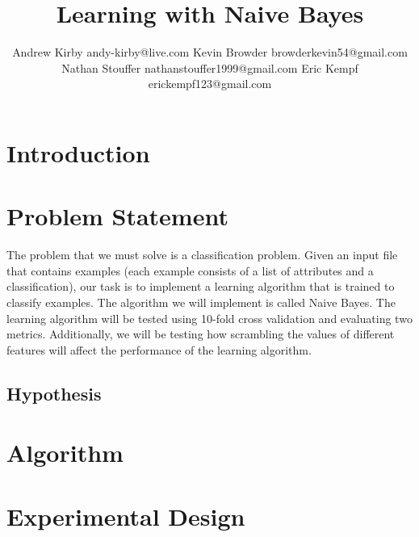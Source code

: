 \documentclass[twoside,11pt]{article}
\begin{document}
\title{Learning with Naive Bayes}

\author{\name Andrew Kirby \email andy-kirby@live.com \AND
		\name Kevin Browder \email browderkevin54@gmail.com \AND
		\name Nathan Stouffer \email nathanstouffer1999@gmail.com \AND
		\name Eric Kempf \email erickempf123@gmail.com }

\editor{}

	
\maketitle

\begin{abstract}
	
\end{abstract}

\begin{keywords}
\end{keywords}

\section{Introduction}

\section{Problem Statement}

The problem that we must solve is a classification problem. Given an input file that contains examples (each example consists of a list of attributes and a classification), our task is to implement a learning algorithm that is trained to classify examples. The algorithm we will implement is called Naive Bayes. The learning algorithm will be tested using 10-fold cross validation and evaluating two metrics. Additionally, we will be testing how scrambling the values of different features will affect the performance of the learning algorithm.

\subsection{Hypothesis}

\section{Algorithm}



\section{Experimental Design}
\end{document}
